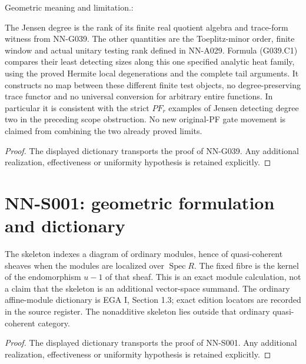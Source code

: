 \begin{geometricstatement}[NN-G039]
Geometric meaning and limitation.:

The Jensen degree is the rank of its finite real quotient algebra
and trace-form witness from NN-G039.  The other quantities are the
Toeplitz-minor order, finite window and actual unitary testing rank
defined in NN-A029.  Formula (G039.C1) compares their least detecting
sizes along this one specified analytic heat family, using the
proved Hermite local degenerations and the complete tail arguments.
It constructs no map between these different finite test objects,
no degree-preserving trace functor and no universal conversion for
arbitrary entire functions.  In particular it is consistent with
the strict $PF_r$ examples of Jensen detecting degree two in the
preceding scope obstruction.  No new original-PF gate movement is
claimed from combining the two already proved limits.



\end{geometricstatement}
\begin{proof} The displayed dictionary transports the proof of NN-G039. Any additional realization, effectiveness or uniformity hypothesis is retained explicitly.\end{proof}


\section{NN-S001: geometric formulation and dictionary}
\begin{geometricstatement}[NN-S001]
The skeleton indexes a diagram of ordinary modules, hence of
quasi-coherent sheaves when the modules are localized over $\operatorname{Spec}R$.
The fixed fibre is the kernel of the endomorphism $u-1$ of that sheaf.
This is an exact module calculation, not a claim that the skeleton is
an additional vector-space summand. The ordinary affine-module
dictionary is EGA I, Section 1.3; exact edition locators are recorded
in the source register. The nonadditive skeleton lies outside that
ordinary quasi-coherent category.
\end{geometricstatement}
\begin{proof} The displayed dictionary transports the proof of NN-S001. Any additional realization, effectiveness or uniformity hypothesis is retained explicitly.\end{proof}


